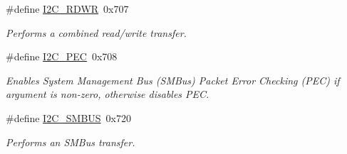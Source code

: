 \begin{DoxyCompactItemize}
\#define \mbox{\hyperlink{group__I2CLinux_ga7645f9831bcbbae2339fcff4d85691be}{I2\+C\+\_\+\+R\+D\+WR}}~0x707
\begin{DoxyCompactList}\small\item\em Performs a combined read/write transfer. \end{DoxyCompactList}\item 
\#define \mbox{\hyperlink{group__I2CLinux_ga2a72d7072db21c407f82e6e73854b38f}{I2\+C\+\_\+\+P\+EC}}~0x708
\begin{DoxyCompactList}\small\item\em Enables System Management Bus (S\+M\+Bus) Packet Error Checking (P\+EC) if argument is non-\/zero, otherwise disables P\+EC. \end{DoxyCompactList}\item 
\#define \mbox{\hyperlink{group__I2CLinux_ga4e9d483fb9eb1074646726ce518b1d4d}{I2\+C\+\_\+\+S\+M\+B\+US}}~0x720
\begin{DoxyCompactList}\small\item\em Performs an S\+M\+Bus transfer. \end{DoxyCompactList}\end{DoxyCompactItemize}
